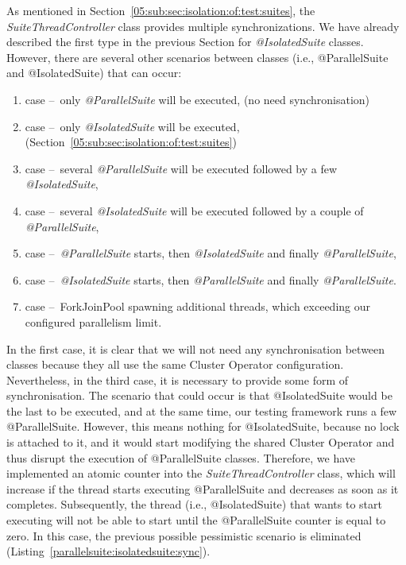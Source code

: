 As mentioned in Section~\ref{05:sub:sec:isolation:of:test:suites}, the \emph{SuiteThreadController} class provides multiple synchronizations.
We have already described the first type in the previous Section for \emph{@IsolatedSuite} classes.
However, there are several other scenarios between classes (i.e., @ParallelSuite and @IsolatedSuite) that can occur:
\begin{enumerate}[itemsep=1mm, parsep=0pt]
\item case \---\ only \emph{@ParallelSuite} will be executed, (no need synchronisation)
\item case \---\ only \emph{@IsolatedSuite} will be executed, (Section~\ref{05:sub:sec:isolation:of:test:suites})
\item case \---\ several \emph{@ParallelSuite} will be executed followed by a few \emph{@IsolatedSuite},
\item case \---\ several \emph{@IsolatedSuite} will be executed followed by a couple of \emph{@ParallelSuite},
\item case \---\ \emph{@ParallelSuite} starts, then \emph{@IsolatedSuite} and finally \emph{@ParallelSuite},
\item case \---\ \emph{@IsolatedSuite} starts, then \emph{@ParallelSuite} and finally \emph{@ParallelSuite}.
\item case \---\ ForkJoinPool spawning additional threads, which exceeding our configured parallelism limit.
\end{enumerate}
In the first case, it is clear that we will not need any synchronisation between classes because they all use the same
Cluster Operator configuration. Nevertheless, in the third case, it is necessary to provide some form of synchronisation.
The scenario that could occur is that @IsolatedSuite would be the last to be executed, and at the same time, our testing
framework runs a few @ParallelSuite. However, this means nothing for @IsolatedSuite, because no lock is attached to it,
and it would start modifying the shared Cluster Operator and thus disrupt the execution of @ParallelSuite classes.
Therefore, we have implemented an atomic counter into the \emph{SuiteThreadController} class, which will increase
if the thread starts executing @ParallelSuite and decreases as soon as it completes. Subsequently, the thread
(i.e., @IsolatedSuite) that wants to start executing will not be able to start until the @ParallelSuite counter is equal to zero.
In this case, the previous possible pessimistic scenario is eliminated (Listing~\ref{parallelsuite:isolatedsuite:sync}).

